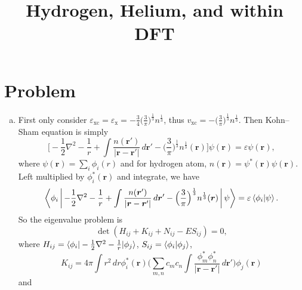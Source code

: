 \documentclass[12pt]{article}
\title{Hydrogen, Helium, and \ce{H2} within DFT}
\author{}
\date{}
\newcommand*{\RMN}[1]{\uppercase\expandafter{\romannumeral#1}}
\begin{document}

\section{Problem \RMN{1}}
\begin{enumerate}[(a)]
    \item First only consider $\varepsilon_{\text{xc}}=\varepsilon_{\text{x}}
              =-\frac{3}{4} \big( \frac{3}{\pi} \big)^{\frac{1}{3}} n^{ \frac{1}{3} }$,
          thus $v_{\text{xc}} = - \big( \frac{3}{\pi} \big)^{\frac{1}{3}}%
              n^{\frac{1}{3}}$.
          Then Kohn--Sham equation is simply
          \begin{equation}
              \bigg[- \frac{1}{2} \nabla^2 - \frac{1}{r} +
              \int \frac{n
                  (\bm{r}')}{\lvert \bm{r} - \bm{r}' \rvert} \, d\bm{r}'
              - \Big( \frac{3}{\pi}\Big)^{\frac{1}{3}} n^{\frac{1}{3}}(\bm{r})
              \bigg]
              \psi(\bm{r}) = \varepsilon \psi(\bm{r}),
          \end{equation}
          where $\psi(\bm{r}) = \sum_{i} \phi_i(r)$
          and for hydrogen atom, $n(\bm{r}) = \psi^\ast(\bm{r}) \psi(\bm{r})$.
          Left multiplied by $\phi_i^\ast(\bm{r})$ and integrate, we have
          \begin{equation}
              \Braket{\phi_i |
              - \frac{1}{2} \nabla^2 - \frac{1}{r} +
              \int \frac{n(\bm{r}')}{\lvert \bm{r} - \bm{r}' \rvert} \, d\bm{r}'
              - \Big( \frac{3}{\pi}\Big)^{\frac{1}{3}} n^{\frac{1}{3}}(\bm{r})
              | \psi } = \varepsilon \braket{\phi_i | \psi}.
          \end{equation}
          So the eigenvalue problem is
          \begin{equation}
              \det (H_{ij} + K_{ij} + N_{ij} - E S_{ij}) = 0,
          \end{equation}
          where $H_{ij} = \braket{\phi_i | - \frac{1}{2}\nabla^2 - \frac{1}{r} | \phi_j}$, $S_{ij} =
              \braket{\phi_i | \phi_j}$,
          \begin{equation}
              K_{ij} = 4\pi \int r^2 \, d r \phi_i^\ast ( \bm{r} )
              \Big(  \sum_{m, n} c_m c_n
              \int  \frac{ \phi_m^\ast  \phi_n^\ast }{ \lvert \bm{r} - \bm{r}' \rvert }\, d \bm{r}' \Big)
              \phi_j ( \bm{r} )
          \end{equation}
          and
          \begin{equation}

\end{equation}
\end{enumerate}
\end{document}
